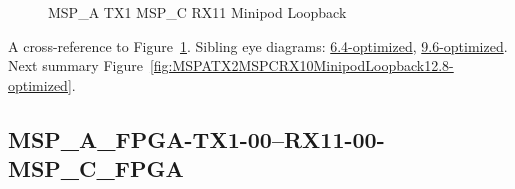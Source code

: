 \begin{figure}[h]
\begin{subfigure}{0.33\textwidth}
\hyperref[sec:MSPAFPGATX106RX1106MSPCFPGA12.8-optimized]{}
\end{subfigure}\hspace*{\fill}
\begin{subfigure}{0.33\textwidth}
\hyperref[sec:MSPAFPGATX107RX1107MSPCFPGA12.8-optimized]{}
\end{subfigure}\hspace*{\fill}
\begin{subfigure}{0.33\textwidth}
\hyperref[sec:MSPAFPGATX108RX1108MSPCFPGA12.8-optimized]{}
\end{subfigure}

\begin{subfigure}{0.33\textwidth}
\hyperref[sec:MSPAFPGATX109RX1109MSPCFPGA12.8-optimized]{}
\end{subfigure}\hspace*{\fill}
\begin{subfigure}{0.33\textwidth}
\hyperref[sec:MSPAFPGATX110RX1110MSPCFPGA12.8-optimized]{}
\end{subfigure}\hspace*{\fill}
\begin{subfigure}{0.33\textwidth}
\hyperref[sec:MSPAFPGATX111RX1111MSPCFPGA12.8-optimized]{}
\end{subfigure}

\caption{MSP\_A TX1 MSP\_C RX11 Minipod Loopback} \label{fig:MSPATX1MSPCRX11MinipodLoopback12.8-optimized}
\end{figure}

A cross-reference to Figure~\ref{fig:MSPATX1MSPCRX11MinipodLoopback12.8-optimized}.
Sibling eye diagrams: \hyperref[sec:MSPATX1MSPCRX11MinipodLoopback6.4-optimized]{6.4-optimized}, \hyperref[sec:MSPATX1MSPCRX11MinipodLoopback9.6-optimized]{9.6-optimized}. \\
Next summary Figure~\ref{fig:MSPATX2MSPCRX10MinipodLoopback12.8-optimized}.
\clearpage
% 
\subsection{MSP\_A\_FPGA-TX1-00--RX11-00-MSP\_C\_FPGA}\label{sec:MSPAFPGATX100RX1100MSPCFPGA12.8-optimized}


